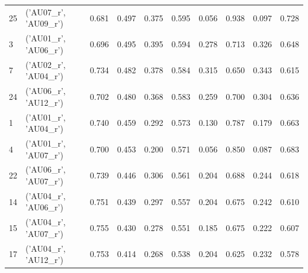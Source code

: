 \begin{tabular}{llrrrrrrrr}
25 & ('AU07_r', 'AU09_r') & 0.681 & 0.497 & 0.375 & 0.595 & 0.056 & 0.938 & 0.097 & 0.728 \\
3 & ('AU01_r', 'AU06_r') & 0.696 & 0.495 & 0.395 & 0.594 & 0.278 & 0.713 & 0.326 & 0.648 \\
7 & ('AU02_r', 'AU04_r') & 0.734 & 0.482 & 0.378 & 0.584 & 0.315 & 0.650 & 0.343 & 0.615 \\
24 & ('AU06_r', 'AU12_r') & 0.702 & 0.480 & 0.368 & 0.583 & 0.259 & 0.700 & 0.304 & 0.636 \\
1 & ('AU01_r', 'AU04_r') & 0.740 & 0.459 & 0.292 & 0.573 & 0.130 & 0.787 & 0.179 & 0.663 \\
4 & ('AU01_r', 'AU07_r') & 0.700 & 0.453 & 0.200 & 0.571 & 0.056 & 0.850 & 0.087 & 0.683 \\
22 & ('AU06_r', 'AU07_r') & 0.739 & 0.446 & 0.306 & 0.561 & 0.204 & 0.688 & 0.244 & 0.618 \\
14 & ('AU04_r', 'AU06_r') & 0.751 & 0.439 & 0.297 & 0.557 & 0.204 & 0.675 & 0.242 & 0.610 \\
15 & ('AU04_r', 'AU07_r') & 0.755 & 0.430 & 0.278 & 0.551 & 0.185 & 0.675 & 0.222 & 0.607 \\
17 & ('AU04_r', 'AU12_r') & 0.753 & 0.414 & 0.268 & 0.538 & 0.204 & 0.625 & 0.232 & 0.578 \\
\bottomrule
\end{tabular}
